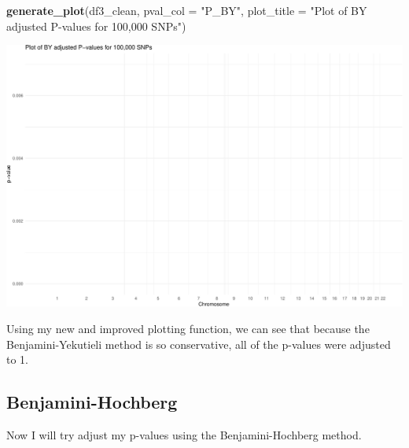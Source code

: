 \documentclass[
  12pt,
]{article}
\newenvironment{Shaded}{\begin{snugshade}}{\end{snugshade}}
\newcommand{\AttributeTok}[1]{\textcolor[rgb]{0.13,0.29,0.53}{#1}}
\newcommand{\CommentTok}[1]{\textcolor[rgb]{0.56,0.35,0.01}{\textit{#1}}}
\newcommand{\FunctionTok}[1]{\textcolor[rgb]{0.13,0.29,0.53}{\textbf{#1}}}
\newcommand{\NormalTok}[1]{#1}
\newcommand{\OtherTok}[1]{\textcolor[rgb]{0.56,0.35,0.01}{#1}}
\newcommand{\SpecialCharTok}[1]{\textcolor[rgb]{0.81,0.36,0.00}{\textbf{#1}}}
\newcommand{\StringTok}[1]{\textcolor[rgb]{0.31,0.60,0.02}{#1}}
\begin{document}
\begin{Shaded}
\begin{Highlighting}[]
\FunctionTok{generate\_plot}\NormalTok{(df3\_clean, }\AttributeTok{pval\_col =} \StringTok{"P\_BY"}\NormalTok{, }\AttributeTok{plot\_title =} \StringTok{"Plot of BY adjusted P{-}values for 100,000 SNPs"}\NormalTok{)}
\end{Highlighting}
\end{Shaded}

\includegraphics{Arkesh_Das_CMSE_410_Semester_Project_files/figure-latex/BY plot test-1.pdf}

Using my new and improved plotting function, we can see that because the
Benjamini-Yekutieli method is so conservative, all of the p-values were
adjusted to 1.

\subsection{Benjamini-Hochberg}\label{benjamini-hochberg}

Now I will try adjust my p-values using the Benjamini-Hochberg method.

\begin{Shaded}
\end{Shaded}
\end{document}
